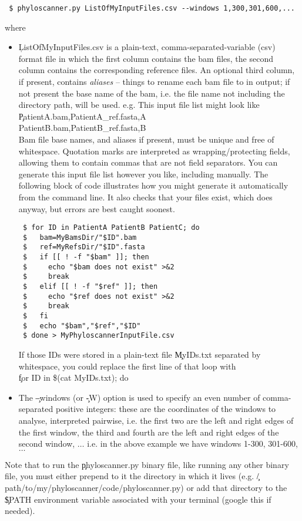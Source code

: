 \begin{verbatim}
 $ phyloscanner.py ListOfMyInputFiles.csv --windows 1,300,301,600,...
\end{verbatim}
where
\begin{itemize}
\item \c{ListOfMyInputFiles.csv} is a plain-text, comma-separated-variable (csv) format file in which the first column contains the bam files, the second column contains the corresponding reference files.
An optional third column, if present, contains {\it aliases} -- things to rename each bam file to in \p output; if not present the base name of the bam, i.e. the file name not including the directory path, will be used.
e.g. This input file list might look like\\
\c{PatientA.bam,PatientA\_ref.fasta,A\\
PatientB.bam,PatientB\_ref.fasta,B}\\
Bam file base names, and aliases if present, must be unique and free of whitespace.
Quotation marks are interpreted as wrapping/protecting fields, allowing them to contain commas that are not field separators.
You can generate this input file list however you like, including manually.
The following block of code illustrates how you might generate it automatically from the command line.
It also checks that your files exist, which \p does anyway, but errors are best caught soonest.
\begin{verbatim}
 $ for ID in PatientA PatientB PatientC; do
 $   bam=MyBamsDir/"$ID".bam
 $   ref=MyRefsDir/"$ID".fasta
 $   if [[ ! -f "$bam" ]]; then
 $     echo "$bam does not exist" >&2
 $     break
 $   elif [[ ! -f "$ref" ]]; then
 $     echo "$ref does not exist" >&2
 $     break
 $   fi
 $   echo "$bam","$ref","$ID"
 $ done > MyPhyloscannerInputFile.csv
\end{verbatim}
If those IDs were stored in a plain-text file \c{MyIDs.txt} separated by whitespace, you could replace the first line of that loop with\\
\c{for ID in \$(cat MyIDs.txt); do}
\item The \c{--windows} (or \c{-W}) option is used to specify an even number of comma-separated positive integers: these are the coordinates of the windows to analyse, interpreted pairwise, i.e. the first two are the left and right edges of the first window, the third and fourth are the left and right edges of the second window, $\ldots$ i.e. in the above example we have windows 1-300, 301-600, $\ldots$
\end{itemize}
Note that to run the \c{phyloscanner.py} binary file, like running any other binary file, you must either prepend to it the directory in which it lives (e.g. \c{/path/to/my/phyloscanner/code/phyloscanner.py}) or add that directory to the \c{\$PATH} environment variable associated with your terminal (google this if needed). 

